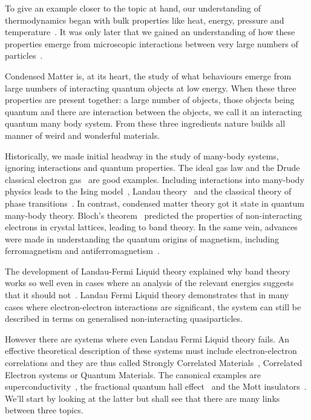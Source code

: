 To give an example closer to the topic at hand, our understanding of thermodynamics began with bulk properties like heat, energy, pressure and temperature~\autocite{saslowHistoryThermodynamicsMissing2020}. It was only later that we gained an understanding of how these properties emerge from microscopic interactions between very large numbers of particles~\autocite{flammHistoryOutlookStatistical1998}.

Condensed Matter is, at its heart, the study of what behaviours emerge from large numbers of interacting quantum objects at low energy. When these three properties are present together: a large number of objects, those objects being quantum and there are interaction between the objects, we call it an interacting quantum many body system. From these three ingredients nature builds all manner of weird and wonderful materials.

Historically, we made initial headway in the study of many-body systems, ignoring interactions and quantum properties. The ideal gas law and the Drude classical electron gas~\autocite{ashcroftSolidStatePhysics1976} are good examples. Including interactions into many-body physics leads to the Ising model~\autocite{isingBeitragZurTheorie1925}, Landau theory~\autocite{landau2013fluid} and the classical theory of phase transitions~\autocite{jaegerEhrenfestClassificationPhase1998}. In contrast, condensed matter theory got it state in quantum many-body theory. Bloch's theorem~\autocite{blochÜberQuantenmechanikElektronen1929} predicted the properties of non-interacting electrons in crystal lattices, leading to band theory. In the same vein, advances were made in understanding the quantum origins of magnetism, including ferromagnetism and antiferromagnetism~\autocite{MagnetismCondensedMatter}.

The development of Landau-Fermi Liquid theory explained why band theory works so well even in cases where an analysis of the relevant energies suggests that it should not~\autocite{wenQuantumFieldTheory2007}. Landau Fermi Liquid theory demonstrates that in many cases where electron-electron interactions are significant, the system can still be described in terms on generalised non-interacting quasiparticles.

However there are systems where even Landau Fermi Liquid theory fails. An effective theoretical description of these systems must include electron-electron correlations and they are thus called Strongly Correlated Materials~\autocite{morosanStronglyCorrelatedMaterials2012}, Correlated Electron systems or Quantum Materials. The canonical examples are superconductivity~\autocite{MicroscopicTheorySuperconductivity}, the fractional quantum hall effect~\autocite{feldmanFractionalChargeFractional2021} and the Mott insulators~\autocite{mottBasisElectronTheory1949,fisherMottInsulatorsSpin1999}. We'll start by looking at the latter but shall see that there are many links between three topics.


